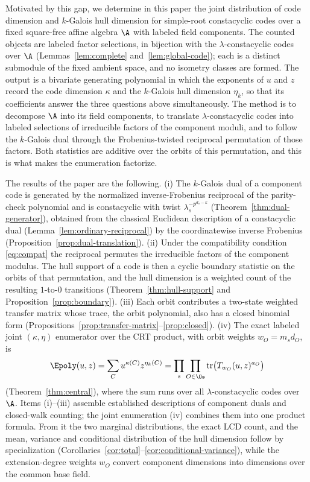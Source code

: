 Motivated by this gap, we determine in this paper the joint distribution of code
dimension and $k$-Galois hull dimension for simple-root constacyclic codes over
a fixed square-free affine algebra $\A$ with labeled field components. The
counted objects are labeled factor selections, in bijection with the
$\lambda$-constacyclic codes over $\A$ (Lemmas~\ref{lem:complete}
and~\ref{lem:global-code}); each is a distinct submodule of the fixed ambient
space, and no isometry classes are formed. The output is a bivariate generating
polynomial in which the exponents of $u$ and $z$ record the code dimension
$\kappa$ and the $k$-Galois hull dimension $\eta_k$, so that its coefficients
answer the three questions above simultaneously. The method is to
decompose $\A$ into its field components, to translate $\lambda$-constacyclic
codes into labeled selections of irreducible factors of the component moduli,
and to follow the $k$-Galois dual through the Frobenius-twisted reciprocal
permutation of those factors. Both statistics are additive over the orbits of
this permutation, and this is what makes the enumeration factorize.

The results of the paper are the following.
(i) The $k$-Galois dual of a component code is generated by the normalized
inverse-Frobenius reciprocal of the parity-check polynomial and is constacyclic
with twist $\lambda_s^{-p^{d_s-k}}$ (Theorem~\ref{thm:dual-generator}), obtained
from the classical Euclidean description of a constacyclic dual
(Lemma~\ref{lem:ordinary-reciprocal}) by the coordinatewise inverse Frobenius
(Proposition~\ref{prop:dual-translation}).
(ii) Under the compatibility condition \eqref{eq:compat} the reciprocal
permutes the irreducible factors of the component modulus. The hull support of a
code is then a cyclic boundary statistic on the orbits of that permutation, and
the hull dimension is a weighted count of the resulting $1$-to-$0$ transitions
(Theorem~\ref{thm:hull-support} and Proposition~\ref{prop:boundary}).
(iii) Each orbit contributes a two-state weighted transfer matrix whose trace,
the orbit polynomial, also has a closed binomial form
(Propositions~\ref{prop:transfer-matrix}--\ref{prop:closed}).
(iv) The exact labeled joint $(\kappa,\eta)$ enumerator over the CRT product,
with orbit weights $w_O=m_sd_O$, is
\[
\Epoly(u,z)=\sum_{C}u^{\kappa(C)}z^{\eta_k(C)}
 =\prod_{s}\prod_{O\in\Os}\operatorname{tr}\bigl(T_{w_O}(u,z)^{a_O}\bigr)
\]
(Theorem~\ref{thm:central}), where the sum runs over all $\lambda$-constacyclic
codes over $\A$. Items (i)--(iii) assemble established descriptions of component
duals and closed-walk counting; the joint enumeration (iv) combines them into
one product formula. From it the two marginal distributions, the exact LCD
count, and the mean, variance and conditional distribution of the hull dimension
follow by specialization
(Corollaries~\ref{cor:total}--\ref{cor:conditional-variance}), while the
extension-degree weights $w_O$ convert component dimensions into dimensions over
the common base field.

